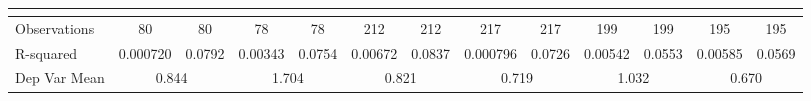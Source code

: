 \begin{tabular}{rrrrrrrrrrrrr}
\multicolumn{1}{l}{} & \multicolumn{1}{l}{} & \multicolumn{1}{l}{} & \multicolumn{1}{l}{} & \multicolumn{1}{l}{} & \multicolumn{1}{l}{} & \multicolumn{1}{l}{} & \multicolumn{1}{l}{} & \multicolumn{1}{l}{} & \multicolumn{1}{l}{} & \multicolumn{1}{l}{} & \multicolumn{1}{l}{} & \multicolumn{1}{l}{} \\
\midrule
\multicolumn{1}{l}{Observations} & \multicolumn{1}{c}{80} & \multicolumn{1}{c}{80} & \multicolumn{1}{c}{78} & \multicolumn{1}{c}{78} & \multicolumn{1}{c}{212} & \multicolumn{1}{c}{212} & \multicolumn{1}{c}{217} & \multicolumn{1}{c}{217} & \multicolumn{1}{c}{199} & \multicolumn{1}{c}{199} & \multicolumn{1}{c}{195} & \multicolumn{1}{c}{195} \\
\multicolumn{1}{l}{R-squared} & \multicolumn{1}{c}{0.000720} & \multicolumn{1}{c}{0.0792} & \multicolumn{1}{c}{0.00343} & \multicolumn{1}{c}{0.0754} & \multicolumn{1}{c}{0.00672} & \multicolumn{1}{c}{0.0837} & \multicolumn{1}{c}{0.000796} & \multicolumn{1}{c}{0.0726} & \multicolumn{1}{c}{0.00542} & \multicolumn{1}{c}{0.0553} & \multicolumn{1}{c}{0.00585} & \multicolumn{1}{c}{0.0569} \\
\multicolumn{1}{l}{Dep Var Mean} & \multicolumn{2}{c}{0.844} & \multicolumn{2}{c}{1.704} & \multicolumn{2}{c}{0.821} & \multicolumn{2}{c}{0.719} & \multicolumn{2}{c}{1.032} & \multicolumn{2}{c}{0.670} \\
\bottomrule
\end{tabular}%

